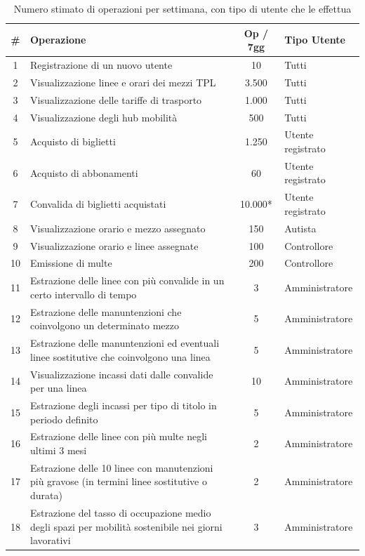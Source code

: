 \documentclass[12pt,a4paper]{report}
\begin{document}
\begin{longtable}{|c|p{7.5cm}|c|l|}
\caption{Numero stimato di operazioni per settimana, con tipo di utente che le effettua}
\label{table:operazioni}\\
\hline
\textbf{\#} & \textbf{Operazione} & \textbf{Op / 7gg} & \textbf{Tipo Utente} \\
\hline
\endhead

1 & Registrazione di un nuovo utente & 10 & Tutti \\
\hline
2 & Visualizzazione linee e orari dei mezzi TPL & 3.500 & Tutti \\
\hline
3 & Visualizzazione delle tariffe di trasporto & 1.000 & Tutti \\
\hline
4 & Visualizzazione degli hub mobilità & 500 & Tutti \\
\hline
5 & Acquisto di biglietti & 1.250 & Utente registrato \\
\hline
6 & Acquisto di abbonamenti & 60 & Utente registrato \\
\hline
7 & Convalida di biglietti acquistati & 10.000* & Utente registrato \\
\hline
8 & Visualizzazione orario e mezzo assegnato & 150 & Autista \\
\hline
9 & Visualizzazione orario e linee assegnate & 100 & Controllore \\
\hline
10 & Emissione di multe & 200 & Controllore \\
\hline
11 & Estrazione delle linee con più convalide in un certo intervallo di tempo & 3 & Amministratore \\
\hline
12 & Estrazione delle manuntenzioni che coinvolgono un determinato mezzo & 5 & Amministratore \\
\hline
13 & Estrazione delle manuntenzioni ed eventuali linee sostitutive che coinvolgono una linea & 5 & Amministratore \\
\hline
14 & Visualizzazione incassi dati dalle convalide per una linea & 10 & Amministratore \\
\hline
15 & Estrazione degli incassi per tipo di titolo in periodo definito & 5 & Amministratore     \\
\hline
16 & Estrazione delle linee con più multe negli ultimi 3 mesi & 2 & Amministratore     \\
\hline
17 & Estrazione delle 10 linee con manutenzioni più gravose (in termini linee sostitutive o durata) & 2 & Amministratore     \\
\hline
18 & Estrazione del tasso di occupazione medio degli spazi per mobilità sostenibile nei giorni lavorativi & 3 & Amministratore     \\

\end{longtable}
\end{document}
